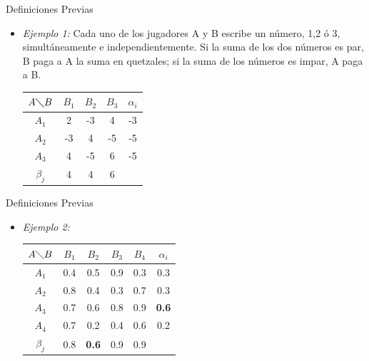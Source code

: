 \documentclass[10pt]{beamer}
\begin{document}
\begin{frame}[fragile]{Definiciones Previas}	
	\begin{itemize}
		\item\textit{Ejemplo 1:} Cada uno de los jugadores A y B escribe un número, 1,2 ó 3, simultáneamente e independientemente. Si la suma de los dos números es par, B paga a A la suma en quetzales; si la suma de los números es impar, A paga a B.
		\begin{table}
			\begin{tabular}{|c|c|c|c||c|}
				\hline 
				$A \diagdown B$ & $B_{1}$ & $B_{2}$ & $B_{3}$ & $\alpha_{i}$ \\ 
				\hline 
				$A_{1}$ & 2 & -3 & 4 & -3 \\ 
				\hline 
				$A_{2}$ & -3 & 4 & -5 & -5  \\ 
				\hline 
				$A_{3}$& 4 & -5 & 6 & -5 \\ 
				\hline 
				\hline
				$\beta_{j}$ & 4 & 4 & 6 &  \\
				\hline
			\end{tabular} 
		\end{table}	
	\end{itemize}
\end{frame}
\begin{frame}[fragile]{Definiciones Previas}	
	\begin{itemize}
		\item\textit{Ejemplo 2:} 
		\begin{table}
			\begin{tabular}{|c|c|c|c|c||c|}
				\hline 
				$A \diagdown B$ & $B_{1}$ & $B_{2}$ & $B_{3}$ & $B_{4}$ & $\alpha_{i}$ \\ 
				\hline 
				$A_{1}$ & 0.4 & 0.5 & 0.9 & 0.3 & 0.3 \\ 
				\hline 
				$A_{2}$ & 0.8 & 0.4 & 0.3  & 0.7 &  0.3 \\ 
				\hline 
				$A_{3}$& 0.7 & 0.6 & 0.8 &  0.9 &  \textbf{0.6} \\ 
				\hline 
				$A_{4}$& 0.7 & 0.2 & 0.4 & 0.6 & 0.2\\
				\hline
				$\beta_{j}$ & 0.8 & \textbf{0.6} & 0.9 & 0.9 &  \\
				\hline
			\end{tabular} 
		\end{table}	
	\end{itemize}
\end{frame}
\end{document}
